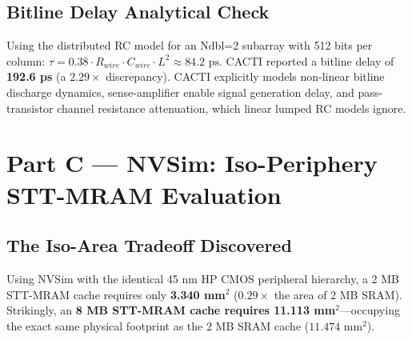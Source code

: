 \documentclass[10pt,a4paper,twocolumn]{article}
\begin{document}
\subsection{Bitline Delay Analytical Check}
Using the distributed RC model for an Ndbl=2 subarray with 512 bits per column:
$\tau = 0.38 \cdot R_{wire} \cdot C_{wire} \cdot L^2 \approx 84.2\text{ ps}$.
CACTI reported a bitline delay of \textbf{192.6 ps} (a $2.29\times$ discrepancy). CACTI explicitly models non-linear bitline discharge dynamics, sense-amplifier enable signal generation delay, and pass-transistor channel resistance attenuation, which linear lumped RC models ignore.

\section{Part C — NVSim: Iso-Periphery STT-MRAM Evaluation}

\subsection{The Iso-Area Tradeoff Discovered}
Using NVSim with the identical 45 nm HP CMOS peripheral hierarchy, a 2 MB STT-MRAM cache requires only \textbf{3.340 mm$^2$} ($0.29\times$ the area of 2 MB SRAM). Strikingly, an \textbf{8 MB STT-MRAM cache requires 11.113 mm$^2$}—occupying the exact same physical footprint as the 2 MB SRAM cache ($11.474\text{ mm}^2$). 

\begin{table}[h]
\centering
\small
\caption{Iso-Capacity (2 MB) \& Iso-Area (8 MB) Comparison vs. SRAM}
\label{tab:nvsim_main}
\end{table}
\end{document}
